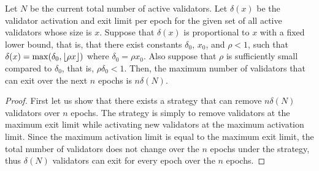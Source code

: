 \begin{lemma}\label{lem:best-strategy}
Let $N$ be the current total number of active validators.
Let $\delta(x)$ be the validator activation and exit limit per epoch for the given set of all active validators whose size is $x$.
Suppose that $\delta(x)$ is proportional to $x$ with a fixed lower bound, that is, that there exist constants $\delta_0$, $x_0$, and $\rho < 1$, such that $\delta(x) = \max(\delta_0, \left\lfloor {\rho x} \right\rfloor)$ where $\delta_0 = \rho x_0$.
Also suppose that $\rho$ is sufficiently small compared to $\delta_0$, that is, $\rho\delta_0 < 1$.
%
Then, the maximum number of validators that can exit over the next $n$ epochs is $n\delta(N)$.
\end{lemma}
\begin{proof}
First let us show that there exists a strategy that can remove $n\delta(N)$ validators over $n$ epochs.
The strategy is simply to remove validators at the maximum exit limit while activating new validators at the maximum activation limit.
Since the maximum activation limit is equal to the maximum exit limit, the total number of validators does not change over the $n$ epochs under the strategy, thus $\delta(N)$ validators can exit for every epoch over the $n$ epochs.


\end{proof}
